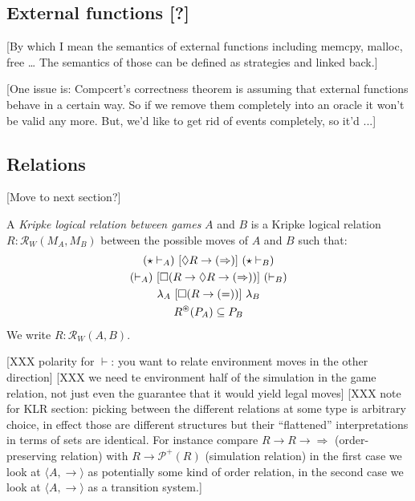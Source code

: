 \documentclass[sigplan,10pt,review,anonymous]{acmart}
\newcommand{\ifr}[1]{\ [{#1}]\ }
\begin{document}

\subsection{External functions [?]} %

[By which I mean the semantics of external functions
including memcpy, malloc, free \ldots
The semantics of those can be defined as strategies
and linked back.]

[One issue is:
Compcert's correctness theorem is
assuming that external functions behave in a certain way.
So if we remove them completely into an oracle
it won't be valid any more.
But,
we'd like to get rid of events completely,
so it'd ...]


\subsection{Relations} %

[Move to next section?]

A \emph{Kripke logical relation between games} $A$ and $B$
is a Kripke logical relation $R : \mathcal{R}_W(M_A, M_B)$
between the possible moves of $A$ and $B$
such that:
\begin{gather*}
  (\star \vdash_A) \ifr{\Diamond R \rightarrow (\Rightarrow)} (\star \vdash_B) \\
  (\vdash_A) \ifr{\Box(R \rightarrow \Diamond R \rightarrow (\Rightarrow))} (\vdash_B) \\
  \lambda_A \ifr{\Box (R \rightarrow (=))} \lambda_B \\
  R^\oast(P_A) \subseteq P_B
\end{gather*}
We write $R : \mathcal{R}_W(A, B)$.


[XXX polarity for $\vdash$: you want to relate environment moves
in the other direction]
[XXX we need te environment half of the simulation
in the game relation, not just even the guarantee that it would yield
legal moves]
[XXX note for KLR section: picking between
the different relations at some type is arbitrary choice,
in effect those are different structures
but their ``flattened'' interpretations in terms of sets are identical.
For instance compare $R \rightarrow R \rightarrow \Rightarrow$
(order-preserving relation)
with $R \rightarrow \mathcal{P}^+(R)$
(simulation relation)
in the first case we look at $\langle A, \rightarrow \rangle$
as potentially some kind of order relation,
in the second case we look at $\langle A, \rightarrow \rangle$
as a transition system.]
\end{document}
